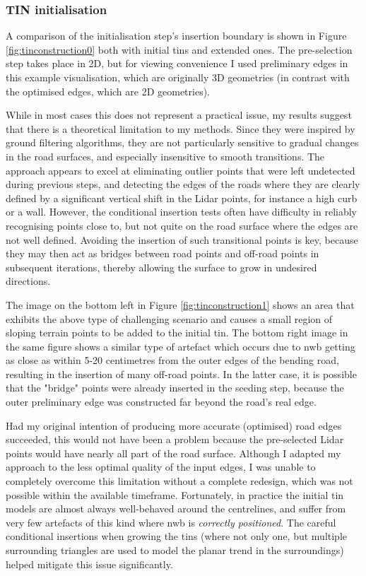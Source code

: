 \subsubsection{TIN initialisation}

A comparison of the initialisation step's insertion boundary is shown in Figure \ref{fig:tinconstruction0} both with initial \ac{tin}s and extended ones. The pre-selection step takes place in 2D, but for viewing convenience I used preliminary edges in this example visualisation, which are originally 3D geometries (in contrast with the optimised edges, which are 2D geometries).

While in most cases this does not represent a practical issue, my results suggest that there is a theoretical limitation to my methods. Since they were inspired by ground filtering algorithms, they are not particularly sensitive to gradual changes in the road surfaces, and especially insensitive to smooth transitions. The approach appears to excel at eliminating outlier points that were left undetected during previous steps, and detecting the edges of the roads where they are clearly defined by a significant vertical shift in the Lidar points, for instance a high curb or a wall. However, the conditional insertion tests often have difficulty in reliably recognising points close to, but not quite on the road surface where the edges are not well defined. Avoiding the insertion of such transitional points is key, because they may then act as bridges between road points and off-road points in subsequent iterations, thereby allowing the surface to grow in undesired directions.

The image on the bottom left in Figure \ref{fig:tinconstruction1} shows an area that exhibits the above type of challenging scenario and causes a small region of sloping terrain points to be added to the initial \ac{tin}. The bottom right image in the same figure shows a similar type of artefact which occurs due to \ac{nwb} getting as close as within 5-20 centimetres from the outer edges of the bending road, resulting in the insertion of many off-road points. In the latter case, it is possible that the "bridge" points were already inserted in the seeding step, because the outer preliminary edge was constructed far beyond the road's real edge.

Had my original intention of producing more accurate (optimised) road edges succeeded, this would not have been a problem because the pre-selected Lidar points would have nearly all part of the road surface. Although I adapted my approach to the less optimal quality of the input edges, I was unable to completely overcome this limitation without a complete redesign, which was not possible within the available timeframe. Fortunately, in practice the initial \ac{tin} models are almost always well-behaved around the centrelines, and suffer from very few artefacts of this kind where \ac{nwb} is \textit{correctly positioned}. The careful conditional insertions when growing the \ac{tin}s (where not only one, but multiple surrounding triangles are used to model the planar trend in the surroundings) helped mitigate this issue significantly.

